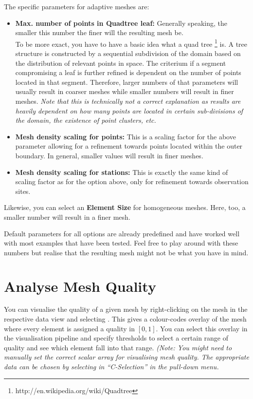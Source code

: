 The specific parameters for adaptive meshes are:
\begin{itemize}
\item \textbf{Max. number of points in Quadtree leaf:} Generally speaking, the smaller this number the finer will the resulting mesh be. \\
    To be more exact, you have to have a basic idea what a quad tree \footnote{http://en.wikipedia.org/wiki/Quadtree} is. A tree structure is constructed by a sequential subdivision of the domain based on the distribution of relevant points in space. The criterium if a segment compromising a leaf is further refined is dependent on the number of points located in that segment. Therefore, larger numbers of that parameters will usually result in coarser meshes while smaller numbers will result in finer meshes. \emph{Note that this is technically not a correct explanation as results are heavily dependent on how many points are located in certain sub-divisions of the domain, the existence of point clusters, etc.}
\item \textbf{Mesh density scaling for points:} This is a scaling factor for the above parameter allowing for a refinement towards points located within the outer boundary. In general, smaller values will result in finer meshes.
\item \textbf{Mesh density scaling for stations:} This is exactly the same kind of scaling factor as for the option above, only for refinement towards observation sites.
\end{itemize}

Likewise, you can select an \textbf{Element Size} for homogeneous meshes. Here, too, a smaller number will result in a finer mesh.

\bigskip

Default parameters for all options are already predefined and have worked well with most examples that have been tested. Feel free to play around with these numbers but realise that the resulting mesh might not be what you have in mind.

\section{Analyse Mesh Quality}

You can visualise the quality of a given mesh by right-clicking on the mesh in the respective data view and selecting . This gives a colour-codes overlay of the mesh where every element is assigned a quality in $[0,1]$. You can select this overlay in the visualisation pipeline and specify thresholds to select a certain range of quality and see which element fall into that range. \textit{(Note: You might need to manually set the correct scalar array for visualising mesh quality. The appropriate data can be chosen by selecting in ``C-Selection'' in the  pull-down menu.}

